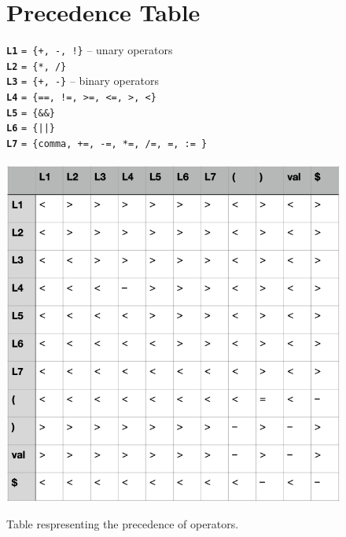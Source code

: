 \documentclass[12pt]{article}
\begin{document}
\newpage
\begin{figure}[H]
\section{Precedence Table}
\label{sec:prectable}
\texttt{\bf{L1}} \texttt{= \{+, -, !\}} – unary operators\\
\texttt{\bf{L2}} \texttt{= \{*, /\}}\\
\texttt{\bf{L3}} \texttt{= \{+,  -\}} – binary operators\\
\texttt{\bf{L4}} \texttt{= \{==, !=, >=, <=, >, <\}}\\
\texttt{\bf{L5}} \texttt{= \{\&\&\}}\\
\texttt{\bf{L6}} \texttt{= \{||\}}\\
\texttt{\bf{L7}} \texttt{= \{comma, +=, -=, *=, /=, =, := \}}\\ 
\\
		\includegraphics[scale=0.75]{img/table_img.png}
		\caption{Table respresenting the precedence of operators.}
		\label{figure:fsm}
\end{figure}

\end{document}
